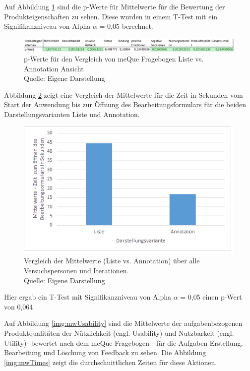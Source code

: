 Auf Abbildung \ref{img:pWerte} sind die p-Werte für Mittelwerte für die Bewertung der Produkteigenschaften zu sehen. Diese wurden in einem T-Test mit ein Signifikanzniveau von Alpha $\alpha$ = 0,05 berechnet. 

\begin{figure}[H]
	\centering
	\includegraphics[width=1.0\textwidth]{resources/evaluation/pWerte.png}
	\caption{p-Werte für den Vergleich von meQue Fragebogen Liste vs. Annotation Ansicht\\Quelle:  Eigene Darstellung}
	\label{img:pWerte}
\end{figure}

Abbildung \ref{img:mwListeAnno} zeigt eine Vergleich der Mittelwerte  für die Zeit in Sekunden vom Start der Anwendung bis zur Öffnung des Bearbeitungsformulars für die beiden Darstellungsvarianten Liste und Annotation.  

\begin{figure}[H]
	\centering
	\includegraphics[width=.8\textwidth]{resources/evaluation/mittelwerte_liste_anno.png}
	\caption{Vergleich der Mittelwerte (Liste vs. Annotation) über alle Versuchspersonen und Iterationen. \\Quelle: Eigene Darstellung}
	\label{img:mwListeAnno}
\end{figure}

Hier ergab ein T-Test mit Signifikanzniveau von Alpha $\alpha$ = 0,05 einen p-Wert von 0,064

Auf Abbildung \ref{img:mwUsability} sind die Mittelwerte der aufgabenbezogenen Produktqualitäten der Nützlichkeit (engl. Usability) und Nutzbarkeit (engl. Utility)- bewertet nach dem meQue Fragebogen - für die 
Aufgaben Erstellung, Bearbeitung und Löschung von Feedback zu sehen. Die Abbildung \ref{img:mwTimes} zeigt die durchschnittlichen Zeiten für diese Aktionen.

